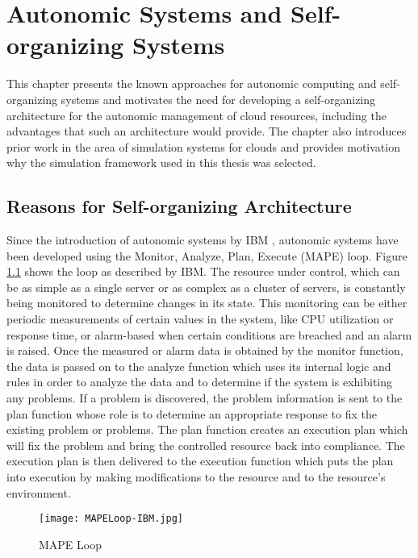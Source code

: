 \chapter{Autonomic Systems and Self-organizing Systems} %
\label{Chapter2}

This chapter presents the known approaches for autonomic computing and self-organizing systems and motivates the need for developing a self-organizing architecture for the autonomic management of cloud resources, including the advantages that such an architecture would provide. The chapter also introduces prior work in the area of simulation systems for clouds and provides motivation why the simulation framework used in this thesis was selected.

\section{Reasons for Self-organizing Architecture}

Since the introduction of autonomic systems by IBM \cite{IBM:acblueprint}, autonomic systems have been developed using the Monitor, Analyze, Plan, Execute (MAPE) loop. Figure \ref{fig:MAPELoop-IBM} shows the loop as described by IBM. The resource under control, which can be as simple as a single server or as complex as a cluster of servers, is constantly being monitored to determine changes in its state. This monitoring can be either periodic measurements of certain values in the system, like CPU utilization or response time, or alarm-based when certain conditions are breached and an alarm is raised. Once the measured or alarm data is obtained by the monitor function, the data is passed on to the analyze function which uses its internal logic and rules in order to analyze the data and to determine if the system is exhibiting any problems. If a problem is discovered, the problem information is sent to the plan function whose role is to determine an appropriate response to fix the existing problem or problems. The plan function creates an execution plan which will fix the problem and bring the controlled resource back into compliance. The execution plan is then delivered to the execution function which puts the plan into execution by making modifications to the resource and to the resource's environment.

\begin{figure}
	\centering
		\texttt{[image: MAPELoop-IBM.jpg]}
		\caption{MAPE Loop}
	\label{fig:MAPELoop-IBM}
\end{figure}

